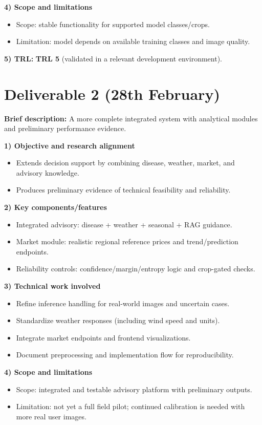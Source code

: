 \documentclass[10pt,a4paper]{article}
\begin{document}
\textbf{4) Scope and limitations}
\begin{itemize}[noitemsep]
  \item Scope: stable functionality for supported model classes/crops.
  \item Limitation: model depends on available training classes and image quality.
\end{itemize}

\textbf{5) TRL:} \textbf{TRL 5} (validated in a relevant development environment).

\section*{Deliverable 2 (28th February)}
\textbf{Brief description:} A more complete integrated system with analytical modules and preliminary performance evidence.

\textbf{1) Objective and research alignment}
\begin{itemize}[noitemsep]
  \item Extends decision support by combining disease, weather, market, and advisory knowledge.
  \item Produces preliminary evidence of technical feasibility and reliability.
\end{itemize}

\textbf{2) Key components/features}
\begin{itemize}[noitemsep]
  \item Integrated advisory: disease + weather + seasonal + RAG guidance.
  \item Market module: realistic regional reference prices and trend/prediction endpoints.
  \item Reliability controls: confidence/margin/entropy logic and crop-gated checks.
\end{itemize}

\textbf{3) Technical work involved}
\begin{itemize}[noitemsep]
  \item Refine inference handling for real-world images and uncertain cases.
  \item Standardize weather responses (including wind speed and units).
  \item Integrate market endpoints and frontend visualizations.
  \item Document preprocessing and implementation flow for reproducibility.
\end{itemize}

\textbf{4) Scope and limitations}
\begin{itemize}[noitemsep]
  \item Scope: integrated and testable advisory platform with preliminary outputs.
  \item Limitation: not yet a full field pilot; continued calibration is needed with more real user images.
\end{itemize}
\end{document}
